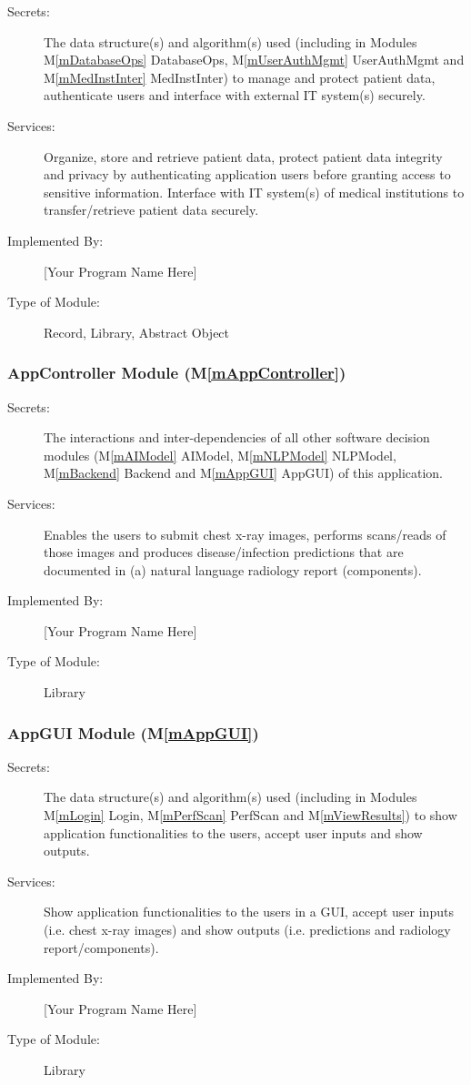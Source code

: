 \documentclass[12pt, titlepage]{article}
\newcommand{\mref}[1]{M\ref{#1}}
\begin{document}
\begin{description}
\item[Secrets:] The data structure(s) and algorithm(s) used (including in
  Modules \mref{mDatabaseOps} DatabaseOps, \mref{mUserAuthMgmt} UserAuthMgmt
  and \mref{mMedInstInter} MedInstInter) to manage and protect patient data,
  authenticate users and interface with external IT system(s) securely.
\item[Services:] Organize, store and retrieve patient data, protect patient
  data integrity and privacy by authenticating application users before
  granting access to sensitive information. Interface with IT system(s) of
  medical institutions to transfer/retrieve patient data securely.
\item[Implemented By:] [Your Program Name Here]
\item[Type of Module:] Record, Library, Abstract Object
\end{description}

\subsubsection{AppController Module (\mref{mAppController})}

\begin{description}
\item[Secrets:] The interactions and inter-dependencies of all other software
  decision modules (\mref{mAIModel} AIModel, \mref{mNLPModel} NLPModel,
  \mref{mBackend} Backend and \mref{mAppGUI} AppGUI) of this application.
\item[Services:] Enables the users to submit chest x-ray images, performs
  scans/reads of those images and produces disease/infection predictions that
  are documented in (a) natural language radiology report (components).
\item[Implemented By:] [Your Program Name Here]
\item[Type of Module:] Library
\end{description}

\subsubsection{AppGUI Module (\mref{mAppGUI})}

\begin{description}
\item[Secrets:] The data structure(s) and algorithm(s) used (including in
  Modules \mref{mLogin} Login, \mref{mPerfScan} PerfScan and
  \mref{mViewResults}) to show application functionalities to the users,
  accept user inputs and show outputs.
\item[Services:] Show application functionalities to the users in a
  GUI, accept user inputs (i.e. chest x-ray images) and show outputs (i.e.
  predictions and radiology report/components).
\item[Implemented By:] [Your Program Name Here]
\item[Type of Module:] Library
\end{description}
\end{document}
